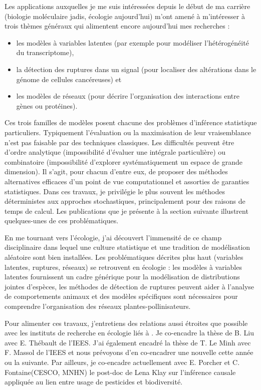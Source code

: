 Les applications auxquelles je me suis intéressées depuis le début de ma carrière (biologie moléculaire jadis, écologie aujourd'hui) m’ont amené à m’intéresser à trois thèmes généraux qui alimentent encore aujourd'hui mes recherches : 
\begin{itemize} 
\item les modèles à variables latentes (par exemple pour modéliser l’hétérogénéité du transcriptome), 
\item la détection des ruptures dans un signal (pour localiser des altérations dans le génome de cellules cancéreuses) et 
\item les modèles de réseaux (pour décrire l’organisation des interactions entre gènes ou protéines).
\end{itemize} 
Ces trois familles de modèles posent chacune des problèmes d’inférence statistique particuliers. Typiquement l’évaluation ou la maximisation de leur vraisemblance n’est pas faisable par des techniques classiques. Les difficultés peuvent être d'ordre analytique (impossibilité d’évaluer une intégrale particulière) ou combinatoire (impossibilité d’explorer systématiquement un espace de grande dimension). Il s’agit, pour chacun d’entre eux, de proposer des méthodes alternatives efficaces d’un point de vue computationnel et assorties de garanties statistiques. Dans ces travaux, je privilégie le plus souvent les méthodes déterministes aux approches stochastiques, principalement pour des raisons de temps de calcul. Les publications que je présente à la section suivante illustrent quelques-unes de ces problématiques.

\bigskip
En me tournant vers l’écologie, j’ai découvert l’immensité de ce champ disciplinaire dans lequel une culture statistique et une tradition de modélisation aléatoire sont bien installées. 
Les problématiques décrites plus haut (variables latentes, ruptures, réseaux) se retrouvent en écologie : les modèles à variables latentes fournissent un cadre générique pour la modélisation de distributions jointes d’espèces, les méthodes de détection de ruptures peuvent aider à l’analyse de comportements animaux et des modèles spécifiques sont nécessaires pour comprendre l’organisation des réseaux plantes-pollinisateurs. 

Pour alimenter ces travaux, j’entretiens des relations aussi étroites que possible avec les instituts de recherche en écologie liés à \SU. Je co-encadre la thèse de B. Liu avec E. Thébault de l’IEES. J’ai également encadré la thèse de T. Le Minh avec F. Massol de l’IEES et nous prévoyons d’en co-encadrer une nouvelle cette année ou la suivante. Par ailleurs, je co-encadre actuellement avec E. Porcher et C. Fontaine(CESCO, MNHN) le post-doc de Lena Klay sur l’inférence causale appliquée au lien entre usage de pesticides et biodiversité. 

